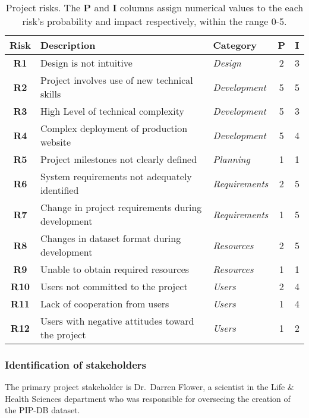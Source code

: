 \begin{table}[H]
\centering
\begin{tabular}{c l l c c}
\textbf{Risk} & \textbf{Description}                              & \textbf{Category}     & \textbf{P} & \textbf{I}\\
\hline
\textbf{R1}   & Design is not intuitive                           & \textit{Design}       & 2          & 3\\
\textbf{R2}   & Project involves use of new technical skills      & \textit{Development}  & 5          & 5\\
\textbf{R3}   & High Level of technical complexity                & \textit{Development}  & 5          & 3\\
\textbf{R4}   & Complex deployment of production website          & \textit{Development}  & 5          & 4\\
\textbf{R5}   & Project milestones not clearly defined            & \textit{Planning}     & 1          & 1\\
\textbf{R6}   & System requirements not adequately identified     & \textit{Requirements} & 2          & 5\\
\textbf{R7}   & Change in project requirements during development & \textit{Requirements} & 1          & 5\\
\textbf{R8}   & Changes in dataset format during development      & \textit{Resources}    & 2          & 5\\
\textbf{R9}   & Unable to obtain required resources               & \textit{Resources}    & 1          & 1\\
\textbf{R10}  & Users not committed to the project                & \textit{Users}        & 2          & 4\\
\textbf{R11}  & Lack of cooperation from users                    & \textit{Users}        & 1          & 4\\
\textbf{R12}  & Users with negative attitudes toward the project  & \textit{Users}        & 1          & 2\\
\end{tabular}
\caption[Project risks]
        {Project risks. The \textbf{P} and \textbf{I} columns assign
         numerical values to the each risk's probability and impact
         respectively, within the range 0-5.}
\label{tab:risks}
\end{table}

\subsubsection*{Identification of stakeholders}

The primary project stakeholder is Dr.\ Darren Flower, a scientist in
the Life \& Health Sciences department who was responsible for
overseeing the creation of the PIP-DB dataset.
